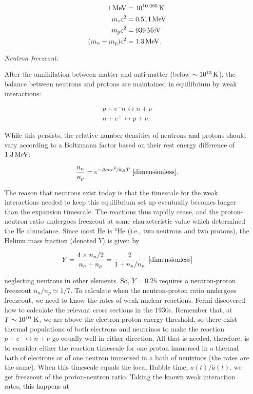 \documentclass[a4paper,11pt]{article}
\begin{document}
\begin{align*}
    1\,{\rm MeV} &= 10^{10.065}\,{\rm K} \\
    m_ec^2 &= 0.511\,{\rm MeV} \\
    m_pc^2 &= 939\,{\rm MeV} \\
    (m_n-m_p)c^2 &= 1.3\,{\rm MeV}.
\end{align*}

{\noindent}\textit{Neutron freezeout:}

{\noindent}After the annihilation between matter and anti-matter (below $\sim10^{13}\,{\rm K}$), the balance between neutrons and protons are maintained in equilibrium by weak interactions:

\begin{align*}
    p + e^-n \leftrightarrow n + \nu \\
    n + e^+ \leftrightarrow p + \bar{\nu}.
\end{align*}

{\noindent}While this persists, the relative number densities of neutrons and protons should vary according to a Boltzmann factor based on their rest energy difference of $1.3\,{\rm MeV}$:

\begin{align*}
    \frac{n_n}{n_p} = e^{-\Delta mc^2/k_BT} ~ [{\rm dimensionless}].
\end{align*}

{\noindent}The reason that neutrons exist today is that the timescale for the weak interactions needed to keep this equilibrium set up eventually becomes longer than the expansion timescale. The reactions thus rapidly cease, and the proton-neutron ratio undergoes freezeout at some characteristic value which determined the He abundance. Since most He is $^4$He (i.e., two neutrons and two protons), the Helium mass fraction (denoted $Y$) is given by

\begin{align*}
    Y = \frac{4\times n_n/2}{n_n + n_p}  = \frac{2}{1 + n_n/n_n} ~ [{\rm dimensionless}]
\end{align*}

{\noindent}neglecting neutrons in other elements. So, $Y=0.25$ requires a neutron-proton freezeout $n_n/n_p\simeq1/7$. To calculate when the neutron-proton ratio undergoes freezeout, we need to know the rates of weak nuclear reactions. Fermi discovered how to calculate the relevant cross sections in the 1930s. Remember that, at $T\sim10^{10}~{\rm K}$, we are above the electron-proton energy threshold, so there exist thermal populations of both electrons and neutrinos to make the reaction $p+e^- \leftrightarrow n+\nu$ go equally well in either direction. All that is needed, therefore, is to consider either the reaction timescale for one proton immersed in a thermal bath of electrons or of one neutron immersed in a bath of neutrinos (the rates are the same). When this timescale equals the local Hubble time, $a(t)/\dot{a}(t)$, we get freezeout of the proton-neutron ratio. Taking the known weak interaction rates, this happens at
\end{document}
